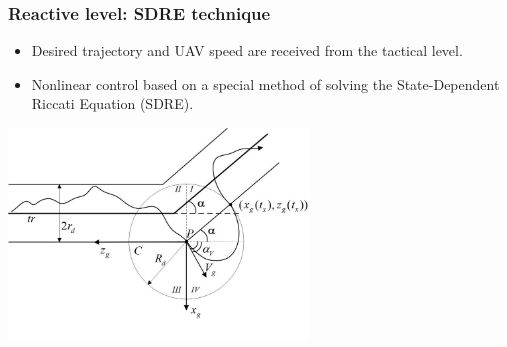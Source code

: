 \documentclass[default]{beamer}
\begin{document}
	\begin{frame}
		\frametitle{Reactive level: SDRE technique}
		\small
		\begin{itemize}
			\item Desired trajectory and UAV speed are received from the tactical level.
			\item Nonlinear control based on a special method of solving the State-Dependent Riccati Equation (SDRE).
			
		\end{itemize}
		\par\bigskip
		\centering
		\includegraphics[width=0.6\textwidth]{misc/plan_2}
		\nocite{*}
		\printbibliography[keyword={sdre}, resetnumbers=true]
	\end{frame}
\end{document}
